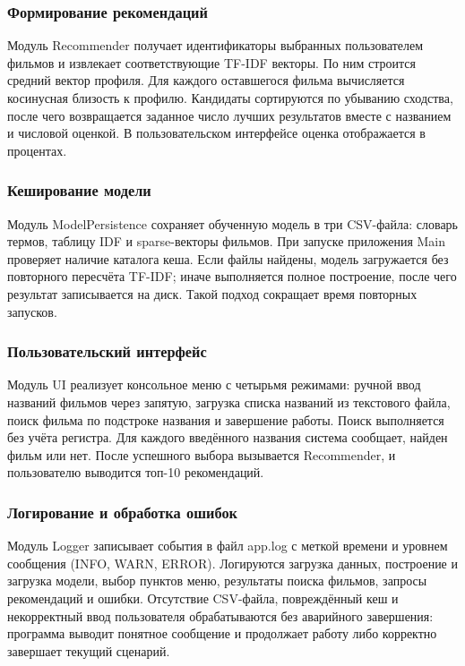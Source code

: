 \documentclass[a4paper, 16pt]{article}
\begin{document}
\subsubsection{Формирование рекомендаций}
Модуль Recommender получает идентификаторы выбранных пользователем фильмов и извлекает соответствующие TF-IDF векторы. 
По ним строится средний вектор профиля. Для каждого оставшегося фильма вычисляется косинусная близость к профилю. 
Кандидаты сортируются по убыванию сходства, после чего возвращается заданное число лучших результатов вместе с 
названием и числовой оценкой. В пользовательском интерфейсе оценка отображается в процентах.

\subsubsection{Кеширование модели}
Модуль ModelPersistence сохраняет обученную модель в три CSV-файла: словарь термов, таблицу IDF и sparse-векторы 
фильмов. При запуске приложения Main проверяет наличие каталога кеша. Если файлы найдены, модель загружается 
без повторного пересчёта TF-IDF; иначе выполняется полное построение, после чего результат записывается на диск. 
Такой подход сокращает время повторных запусков.

\subsubsection{Пользовательский интерфейс}
Модуль UI реализует консольное меню с четырьмя режимами: ручной ввод названий фильмов через запятую, загрузка 
списка названий из текстового файла, поиск фильма по подстроке названия и завершение работы. Поиск выполняется 
без учёта регистра. Для каждого введённого названия система сообщает, найден фильм или нет. После успешного выбора 
вызывается Recommender, и пользователю выводится топ-10 рекомендаций.

\subsubsection{Логирование и обработка ошибок}

Модуль Logger записывает события в файл app.log с меткой времени и уровнем сообщения (INFO, WARN, ERROR). 
Логируются загрузка данных, построение и загрузка модели, выбор пунктов меню, результаты поиска фильмов, 
запросы рекомендаций и ошибки. Отсутствие CSV-файла, повреждённый кеш и некорректный ввод пользователя 
обрабатываются без аварийного завершения: программа выводит понятное сообщение и продолжает работу либо 
корректно завершает текущий сценарий.
\end{document}
